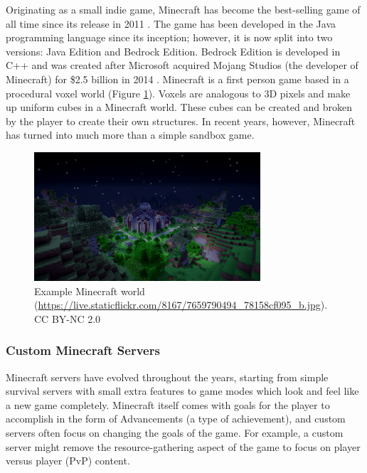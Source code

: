 \documentclass[12pt]{article}
\begin{document}
\begin{onehalfspacing}
Originating as a small indie game, Minecraft has become the best-selling
game of all time since its release in 2011 \parencite{mojang2019}. 
The game has been developed in the Java programming language since its inception;
however, it is now split into two versions: Java Edition and Bedrock
Edition. Bedrock Edition is developed in C++ and was created after
Microsoft acquired Mojang Studios (the developer of Minecraft) for \$2.5
billion in 2014 \parencite{peckham2014}. Minecraft is a first person game based
in a procedural voxel world (Figure \ref{fig:2_4_1}). Voxels are analogous to 3D pixels and make
up uniform cubes in a Minecraft world. These cubes can be created and
broken by the player to create their own structures. In recent years,
however, Minecraft has turned into much more than a simple sandbox game.



\begin{figure}[h] 
    \centering
    \includegraphics[width=0.75\textwidth]{media/media/image2.jpg} 
    \caption{Example Minecraft world \protect \\ (\href{https://live.staticflickr.com/8167/7659790494_78158cf095_b.jpg}{{https://live.staticflickr.com/8167/7659790494\_78158cf095\_b.jpg}}). CC BY-NC 2.0} 
    \label{fig:2_4_1} 
\end{figure}

\subsubsection{Custom Minecraft Servers}

Minecraft servers have evolved throughout the years, starting from
simple survival servers with small extra features to game modes which
look and feel like a new game completely. Minecraft itself comes with
goals for the player to accomplish in the form of Advancements (a type
of achievement), and custom servers often focus on changing the goals of
the game. For example, a custom server might remove the
resource-gathering aspect of the game to focus on player versus player
(PvP) content.


\end{onehalfspacing}
\end{document}
